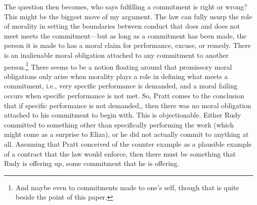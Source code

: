 The question then becomes, who says fulfilling a commitment is right or
wrong? This might be the biggest move of my argument. The law can fully
usurp the role of morality in setting the boundaries between conduct
that does and does not meet meets the commitment---but as long as a
commitment has been made, the person it is made to has a moral claim for
performance, excuse, or remedy. There is an inalienable moral obligation
attached to any commitment to another person.\footnote{And maybe even to
  commitments made to one's self, though that is quite beside the point
  of this paper.} There seems to be a notion floating around that
promissory moral obligations only arise when morality plays a role in
defining what meets a commitment, i.e., very specific performance is
demanded, and a moral failing occurs when specific performance is not
met. So, Pratt comes to the conclusion that if specific performance is
not demanded,, then there was no moral obligation attached to his
commitment to begin with. This is objectionable. Either Rudy committed
to something other than specifically performing the work (which might
come as a surprise to Eliza), or he did not actually commit to anything
at all. Assuming that Pratt conceived of the counter example as a
plausible example of a contract that the law would enforce, then there
must be something that Rudy is offering up, some commitment that he is
offering.

